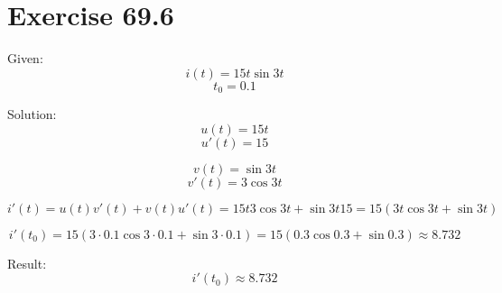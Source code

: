 \documentclass[a4paper, 10pt]{scrartcl}
\begin{document}
\section{Exercise 69.6}

Given:
\[i(t) = 15t\sin{3t}\]
\[t_{0} = 0.1\]

Solution:
\[u(t) = 15t\]
\[u'(t) = 15\]

\[v(t) = \sin{3t}\]
\[v'(t) = 3\cos{3t}\]

\[i'(t) = u(t)v'(t) + v(t)u'(t) = 15t3\cos{3t} + \sin{3t}15 = 15(3t\cos{3t} + \sin{3t})\]

\[i'(t_{0}) = 15(3\cdot 0.1\cos{3\cdot 0.1} + \sin{3 \cdot 0.1}) =
              15(0.3\cos{0.3} + \sin{0.3}) \approx 8.732\]

Result:
\[i'(t_{0}) \approx 8.732\]
\end{document}
